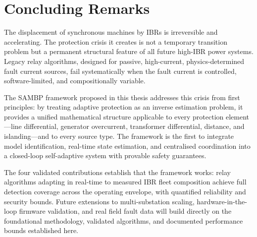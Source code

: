 \section{Concluding Remarks}
\label{sec:ch13_concluding}

The displacement of synchronous machines by IBRs is irreversible and
accelerating. The protection crisis it creates is not a temporary
transition problem but a permanent structural feature of all future
high-IBR power systems. Legacy relay algorithms, designed for passive,
high-current, physics-determined fault current sources, fail systematically
when the fault current is controlled, software-limited, and compositionally
variable.

The SAMBP framework proposed in this thesis addresses this crisis from
first principles: by treating adaptive protection as an inverse estimation
problem, it provides a unified mathematical structure applicable to every
protection element---line differential, generator overcurrent, transformer
differential, distance, and islanding---and to every source type.
The framework is the first to integrate model identification, real-time
state estimation, and centralised coordination into a closed-loop
self-adaptive system with provable safety guarantees.

The four validated contributions establish that the framework works: relay
algorithms adapting in real-time to measured IBR fleet composition achieve
full detection coverage across the operating envelope, with quantified
reliability and security bounds. Future extensions to multi-substation
scaling, hardware-in-the-loop firmware validation, and real field fault
data will build directly on the foundational methodology, validated
algorithms, and documented performance bounds established here.
